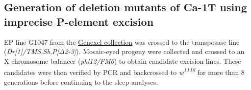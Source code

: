 \subsection*{Generation of deletion mutants of Ca-\alpha1T using imprecise P-element excision}

EP line G1047 from the \href{http://genexel.kaist.ac.kr}{Genexel collection} was crossed to the transposase line (\emph{Dr[1]/TMS,Sb,P[$\Delta$2-3]}). Mosaic-eyed progeny were collected and crossed to an X chromosome balancer (\emph{phl12/FM6}) to obtain candidate excision lines. These candidates were then verified by PCR and backcrossed to \emph{w\textsuperscript{1118}} for more than 8 generations before continuing to the sleep analyses.
